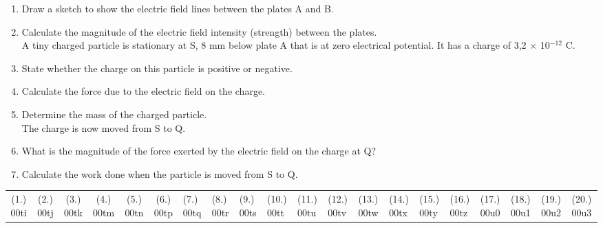 \begin{eocexercises}{}
\begin{enumerate}
{\begin{enumerate}
\item{Draw a sketch to show the electric field lines between the plates A and B.}
\item{Calculate the magnitude of the electric field intensity (strength) between the plates.}\\

A tiny charged particle is stationary at S, 8 mm below plate A
that is at zero electrical potential. It has a charge of 3,2
$\times$ 10$^{-12}$ C.
\item{State whether the charge on this particle is positive or negative.}
\item{Calculate the force due to the electric field on the charge.}
\item{Determine the mass of the charged particle.}\\

The charge is now moved from S to Q.
\item{What is the magnitude of the force exerted by the electric field on the charge at Q?}
\item{Calculate the work done when the particle is moved from S to Q.}
\end{enumerate}}

\end{enumerate}
\practiceinfo

\begin{tabular}[h]{cccccc}
(1.) 00ti & (2.) 00tj & (3.) 00tk & (4.) 00tm & (5.) 00tn & (6.) 00tp & (7.) 00tq & (8.) 00tr & (9.) 00ts & (10.) 00tt & (11.) 00tu & (12.) 00tv & (13.) 00tw & (14.) 00tx & (15.) 00ty & (16.) 00tz & (17.) 00u0 & (18.) 00u1 & (19.) 00u2 & (20.) 00u3 & 
 \end{tabular}
\end{eocexercises}





